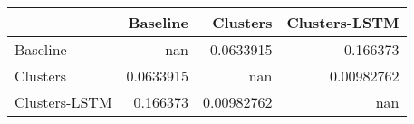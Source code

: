 \begin{tabular}{lrrr}
\toprule
               &    Baseline &     Clusters &   Clusters-LSTM \\
\midrule
 Baseline      & nan         &   0.0633915  &      0.166373   \\
 Clusters      &   0.0633915 & nan          &      0.00982762 \\
 Clusters-LSTM &   0.166373  &   0.00982762 &    nan          \\
\bottomrule
\end{tabular}